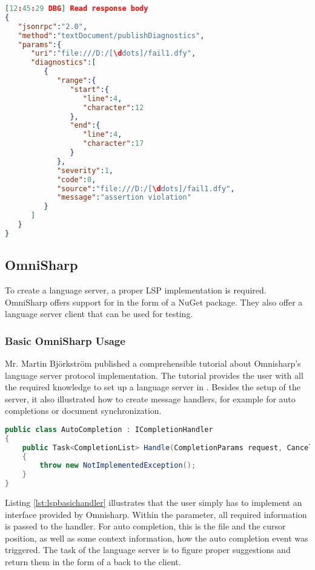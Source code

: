 \begin{lstlisting}[language=json, caption={LSP Message Example}, captionpos=b, label={lst:lspjsonmsg}]
[12:45:29 DBG] Read response body
{
   "jsonrpc":"2.0",
   "method":"textDocument/publishDiagnostics",
   "params":{
      "uri":"file:///D:/[\ddots]/fail1.dfy",
      "diagnostics":[
         {
            "range":{
               "start":{
                  "line":4,
                  "character":12
               },
               "end":{
                  "line":4,
                  "character":17
               }
            },
            "severity":1,
            "code":0,
            "source":"file:///D:/[\ddots]/fail1.dfy",
            "message":"assertion violation"
         }
      ]
   }
}
\end{lstlisting}

\subsection{OmniSharp}
\label{section:analysis:omnisharp}
To create a language server, a proper LSP implementation is required.
OmniSharp offers support for \Csharp \cite{langserverdotorg} in the form of a NuGet package.
They also offer a language server client that can be used for testing.

\subsubsection{Basic OmniSharp Usage}
Mr. Martin Bj\"orkstr\"om published a comprehensible tutorial about Omnisharp's language server protocol implementation.
The tutorial provides the user with all the required knowledge to set up a language server in \Csharp.
Besides the setup of the server, it also illustrated how to create message handlers, for example for auto completions or document synchronization.

\begin{lstlisting}[language=csharp, caption={LSP Handler Implementation}, captionpos=b, label={lst:lspbasichandler}]
public class AutoCompletion : ICompletionHandler
{
    public Task<CompletionList> Handle(CompletionParams request, CancellationToken cancellationToken)
    {
        throw new NotImplementedException();
    }
}
\end{lstlisting}

Listing \ref{lst:lspbasichandler} illustrates that the user simply has to implement an interface provided by Omnisharp.
Within the  parameter, all required information is passed to the handler.
For auto completion, this is the file and the cursor position, as well as some context information, how the auto completion event was triggered.
The task of the language server is to figure proper suggestions and return them in the form of a  back to the client.\\

